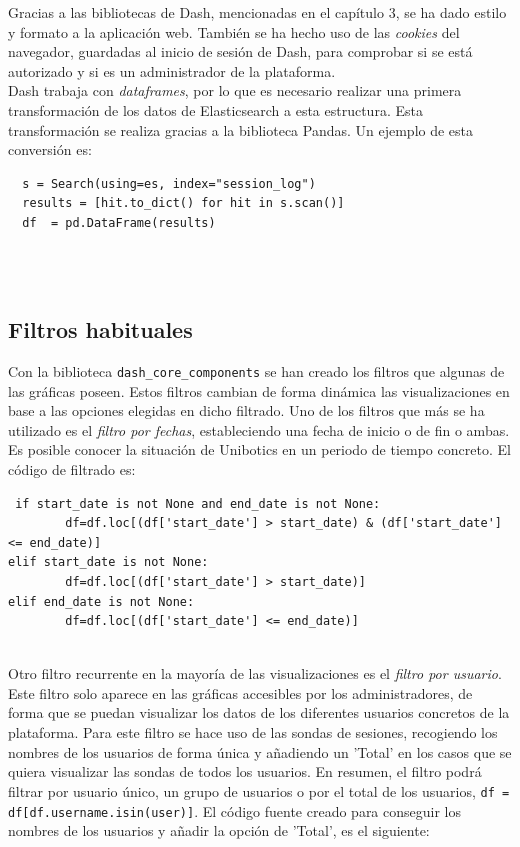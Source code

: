 Gracias a las bibliotecas de Dash, mencionadas en el capítulo 3, se ha dado estilo y formato a la aplicación web. También se ha hecho uso de las \textit{cookies }del navegador, guardadas al inicio de sesión de Dash, para comprobar si se está autorizado y si es un administrador de la plataforma.\\

Dash trabaja con \textit{dataframes}, por lo que es necesario realizar una primera transformación de los datos de Elasticsearch a esta estructura. Esta transformación se realiza gracias a la biblioteca Pandas. Un ejemplo de esta conversión es:

\begin{lstlisting}
  s = Search(using=es, index="session_log")
  results = [hit.to_dict() for hit in s.scan()]
  df  = pd.DataFrame(results)
\end{lstlisting}

\\
\\
\newpage
\subsection{Filtros habituales}
Con la biblioteca \texttt{dash\_core\_components} se han creado los filtros que algunas de las gráficas poseen. Estos filtros cambian de forma dinámica las visualizaciones en base a las opciones elegidas en dicho filtrado. Uno de los filtros que más se ha utilizado es el \textit{filtro por fechas}, estableciendo una fecha de inicio o de fin o ambas. Es posible conocer la situación de Unibotics en un periodo de tiempo concreto. El código de filtrado es:

\begin{lstlisting}
 if start_date is not None and end_date is not None:
        df=df.loc[(df['start_date'] > start_date) & (df['start_date'] <= end_date)]
elif start_date is not None:
        df=df.loc[(df['start_date'] > start_date)]
elif end_date is not None:
        df=df.loc[(df['start_date'] <= end_date)]
\end{lstlisting}
\\

Otro filtro recurrente en la mayoría de las visualizaciones es el \textit{filtro por usuario}. Este filtro solo aparece en las gráficas accesibles por los administradores, de forma que se puedan visualizar los datos de los diferentes usuarios concretos de la plataforma. Para este filtro se hace uso de las sondas de sesiones, recogiendo los nombres de los usuarios de forma única y añadiendo un 'Total' en los casos que se quiera visualizar las sondas de todos los usuarios. En resumen, el filtro podrá filtrar por usuario único, un grupo de usuarios o por el total de los usuarios, \newline\texttt{df = df[df.username.isin(user)]}. El código fuente creado para conseguir los nombres de los usuarios y añadir la opción de 'Total', es el siguiente:

